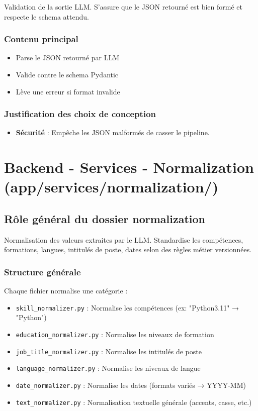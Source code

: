 \documentclass[12pt,a4paper,oneside]{book}
\begin{document}
Validation de la sortie LLM. S'assure que le JSON retourné est bien formé et respecte le schema attendu.

\subsubsection{Contenu principal}

\begin{itemize}
    \item Parse le JSON retourné par LLM
    \item Valide contre le schema Pydantic
    \item Lève une erreur si format invalide
\end{itemize}

\subsubsection{Justification des choix de conception}

\begin{itemize}
    \item \textbf{Sécurité} : Empêche les JSON malformés de casser le pipeline.
\end{itemize}

\newpage

\section{Backend - Services - Normalization (app/services/normalization/)}

\subsection{Rôle général du dossier normalization}

Normalisation des valeurs extraites par le LLM. Standardise les compétences, formations, langues, intitulés de poste, dates selon des règles métier versionnées.

\subsubsection{Structure générale}

Chaque fichier normalise une catégorie :
\begin{itemize}
    \item \texttt{skill\_normalizer.py} : Normalise les compétences (ex: "Python3.11" → "Python")
    \item \texttt{education\_normalizer.py} : Normalise les niveaux de formation
    \item \texttt{job\_title\_normalizer.py} : Normalise les intitulés de poste
    \item \texttt{language\_normalizer.py} : Normalise les niveaux de langue
    \item \texttt{date\_normalizer.py} : Normalise les dates (formats variés → YYYY-MM)
    \item \texttt{text\_normalizer.py} : Normalisation textuelle générale (accents, casse, etc.)
\end{itemize}
\end{document}
